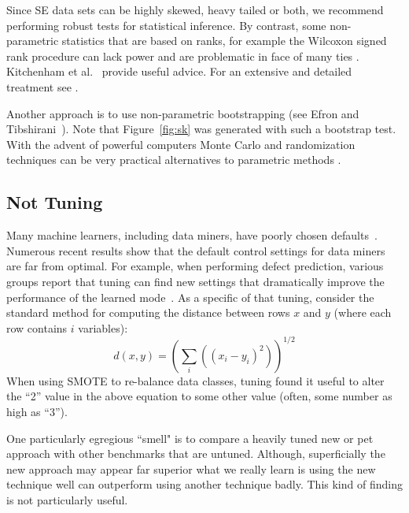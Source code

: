 \documentclass[preprint,10pt]{elsarticle}
\begin{document}
Since SE data sets can be highly skewed, heavy tailed or both, we recommend performing robust tests for statistical inference. By contrast, some non-parametric statistics that are based on ranks, for example the Wilcoxon signed rank procedure can lack power and are problematic in face of many ties \cite{Blai85}.  Kitchenham et al.~\cite{Kitc17} provide useful advice.  For an extensive and detailed treatment see \cite{Wilc12}.  

Another approach is to use non-parametric bootstrapping (see Efron and Tibshirani~\cite[p220-223]{efron93}). Note that  Figure~\ref{fig:sk} was generated with
such a bootstrap test.  With the advent of powerful computers Monte Carlo and randomization techniques can be very practical alternatives to parametric methods \cite{Manl97}.


 
\subsection{Not Tuning}

Many machine learners, including data miners, have poorly chosen defaults~\cite{van2017automatic, herodotou2011starfish, fu2016, tantithamthavorn2016automated, agrawal16, agrawal18}.  Numerous recent results show that the default control settings for data miners are far from optimal. For example, when performing defect prediction, various groups report that tuning can find new settings that dramatically improve the performance of the learned mode~\cite{fu2016, tantithamthavorn2016automated,tantithamthavorn2018impact}. As a specific of that tuning, consider the standard method for computing the distance between rows $x$ and $y$ (where each row contains $i$ variables):
  \[d(x,y)=\left(\sum_i\left((x_i-y_i)^2\right)\right)^{1/2}\]
 When using SMOTE to re-balance data classes, tuning found it useful
 to alter the   ``2'' value in the above equation to some other value
(often, some number as high as ``3'').

One particularly egregious ``smell" is to compare a heavily tuned new or pet approach with other benchmarks that are untuned.  Although, superficially the new approach may appear far superior what we really learn is using the new technique well can outperform using another technique badly.  This kind of finding is not particularly useful.
\end{document}
